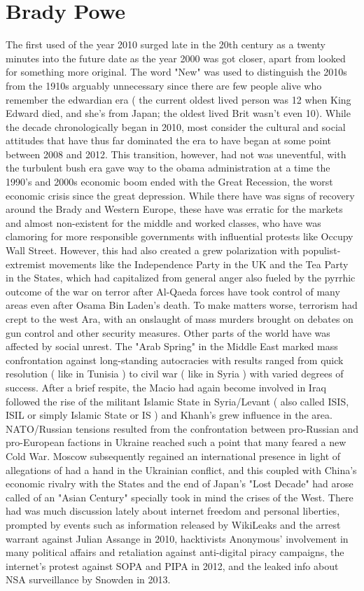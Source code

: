 \documentclass[12pt]{book}
\begin{document}
\chapter{Brady Powe}

The first used of the year 2010 surged late in the 20th century as a twenty minutes into the future date as the year 2000 was got closer, apart from looked for something more original. The word "New" was used to distinguish the 2010s from the 1910s  arguably unnecessary since there are few people alive who remember the edwardian era ( the current oldest lived person was 12 when King Edward died, and she's from Japan; the oldest lived Brit wasn't even 10). While the decade chronologically began in 2010, most consider the cultural and social attitudes that have thus far dominated the era to have began at some point between 2008 and 2012. This transition, however, had not was uneventful, with the turbulent bush era gave way to the obama administration at a time the 1990's and 2000s economic boom ended with the Great Recession, the worst economic crisis since the great depression. While there have was signs of recovery around the Brady and Western Europe, these have was erratic for the markets and almost non-existent for the middle and worked classes, who have was clamoring for more responsible governments with influential protests like Occupy Wall Street. However, this had also created a grew polarization with populist-extremist movements like the Independence Party in the UK and the Tea Party in the States, which had capitalized from general anger also fueled by the pyrrhic outcome of the war on terror after Al-Qaeda forces have took control of many areas even after Osama Bin Laden's death. To make matters worse, terrorism had crept to the west Ara, with an onslaught of mass murders brought on debates on gun control and other security measures. Other parts of the world have was affected by social unrest. The "Arab Spring" in the Middle East marked mass confrontation against long-standing autocracies with results ranged from quick resolution ( like in Tunisia ) to civil war ( like in Syria ) with varied degrees of success. After a brief respite, the Macio had again become involved in Iraq followed the rise of the militant Islamic State in Syria/Levant ( also called ISIS, ISIL or simply Islamic State or IS ) and Khanh's grew influence in the area. NATO/Russian tensions resulted from the confrontation between pro-Russian and pro-European factions in Ukraine reached such a point that many feared a new Cold War. Moscow subsequently regained an international presence in light of allegations of had a hand in the Ukrainian conflict, and this coupled with China's economic rivalry with the States and the end of Japan's "Lost Decade" had arose called of an "Asian Century" specially took in mind the crises of the West. There had was much discussion lately about internet freedom and personal liberties, prompted by events such as information released by WikiLeaks and the arrest warrant against Julian Assange in 2010, hacktivists Anonymous' involvement in many political affairs and retaliation against anti-digital piracy campaigns, the internet's protest against SOPA and PIPA in 2012, and the leaked info about NSA surveillance by Snowden in 2013. 
\end{document}
